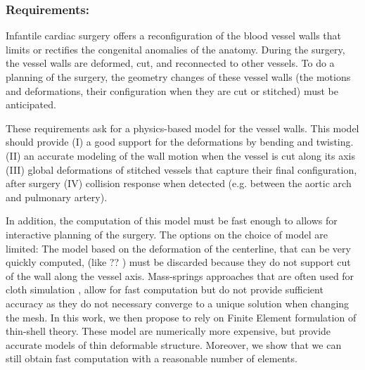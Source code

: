 \subsubsection{Requirements: } 
Infantile cardiac surgery offers a reconfiguration of the blood vessel walls that limits or rectifies the congenital anomalies of the anatomy.
During the surgery, the vessel walls are deformed, cut, and reconnected to other vessels.
To do a planning of the surgery, the geometry changes of these vessel walls (the motions and deformations, their configuration when they are cut or stitched)  must be anticipated.

These requirements ask for a physics-based model for the vessel walls. 
This model should provide 
(I) a good support for the deformations by bending and twisting. 
(II) an accurate modeling of the wall motion when the vessel is cut along its axis 
(III) global deformations of stitched vessels that capture their final configuration, after surgery 
(IV) collision response when detected (e.g. between the aortic arch and pulmonary artery). 

In addition, the computation of this model must be fast enough to allows for interactive planning of the surgery. 
The options on the choice of model are limited: 
The model based on the deformation of the centerline, that can be very quickly computed, (like ??   ) must be discarded because they do not support cut of the wall along the vessel axis. 
Mass-springs approaches that are often used for cloth simulation \cite{Volino2005b}, allow for fast computation but do not provide sufficient accuracy as they do not necessary converge to a unique solution when changing the mesh.
In this work, we then propose to rely on Finite Element formulation of thin-shell theory. 
These model are numerically more expensive, but provide accurate models of thin deformable structure.%
Moreover, we show that we can still obtain fast computation with a reasonable number of elements.


